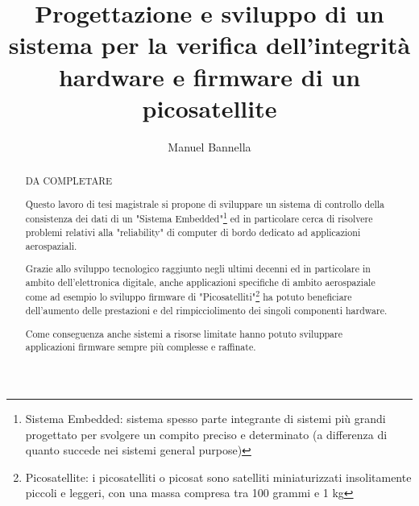 \documentclass[LaM,binding=0.6cm]{../sapthesis}
\title{Progettazione e sviluppo di un sistema per la verifica
dell’integrità hardware e
firmware di un picosatellite}
\author{Manuel Bannella}
\begin{document}
\frontmatter

\maketitle

\dedication{Dedicato a\\ Francesco Savi}

\begin{abstract}
DA COMPLETARE



Questo lavoro di tesi magistrale si propone di sviluppare un sistema di controllo della consistenza dei dati di un "Sistema Embedded"\footnote{Sistema Embedded: sistema spesso parte integrante di sistemi più grandi progettato per svolgere un compito preciso e determinato (a differenza di quanto succede nei sistemi general purpose)} ed in particolare cerca di risolvere problemi relativi alla "reliability" di computer di bordo dedicato ad applicazioni aerospaziali.

Grazie allo sviluppo tecnologico raggiunto negli ultimi decenni ed in particolare in ambito dell'elettronica digitale, anche applicazioni specifiche di ambito aerospaziale come ad esempio lo sviluppo firmware di "Picosatelliti"\footnote{Picosatellite: i picosatelliti o picosat sono satelliti miniaturizzati insolitamente piccoli e leggeri, con una massa compresa tra 100 grammi e 1 kg} ha potuto beneficiare dell'aumento delle prestazioni e del rimpicciolimento dei singoli componenti hardware. 

Come conseguenza anche sistemi a risorse limitate hanno potuto sviluppare applicazioni firmware sempre più complesse e raffinate.


\end{abstract}
\end{document}
